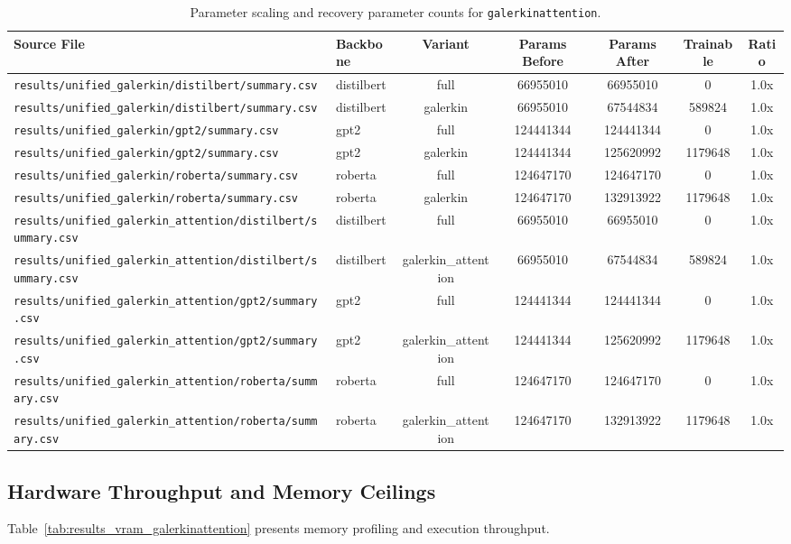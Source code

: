 \begin{table}[t]
\centering
\small
\begin{tabular}{llccccc}
\toprule
\textbf{Source File} & \textbf{Backbone} & \textbf{Variant} & \textbf{Params Before} & \textbf{Params After} & \textbf{Trainable} & \textbf{Ratio} \\
\midrule
\texttt{results/unified\_galerkin/distilbert/summary.csv} & distilbert & full & 66955010 & 66955010 & 0 & 1.0x \\
\texttt{results/unified\_galerkin/distilbert/summary.csv} & distilbert & galerkin & 66955010 & 67544834 & 589824 & 1.0x \\
\texttt{results/unified\_galerkin/gpt2/summary.csv} & gpt2 & full & 124441344 & 124441344 & 0 & 1.0x \\
\texttt{results/unified\_galerkin/gpt2/summary.csv} & gpt2 & galerkin & 124441344 & 125620992 & 1179648 & 1.0x \\
\texttt{results/unified\_galerkin/roberta/summary.csv} & roberta & full & 124647170 & 124647170 & 0 & 1.0x \\
\texttt{results/unified\_galerkin/roberta/summary.csv} & roberta & galerkin & 124647170 & 132913922 & 1179648 & 1.0x \\
\texttt{results/unified\_galerkin\_attention/distilbert/summary.csv} & distilbert & full & 66955010 & 66955010 & 0 & 1.0x \\
\texttt{results/unified\_galerkin\_attention/distilbert/summary.csv} & distilbert & galerkin\_attention & 66955010 & 67544834 & 589824 & 1.0x \\
\texttt{results/unified\_galerkin\_attention/gpt2/summary.csv} & gpt2 & full & 124441344 & 124441344 & 0 & 1.0x \\
\texttt{results/unified\_galerkin\_attention/gpt2/summary.csv} & gpt2 & galerkin\_attention & 124441344 & 125620992 & 1179648 & 1.0x \\
\texttt{results/unified\_galerkin\_attention/roberta/summary.csv} & roberta & full & 124647170 & 124647170 & 0 & 1.0x \\
\texttt{results/unified\_galerkin\_attention/roberta/summary.csv} & roberta & galerkin\_attention & 124647170 & 132913922 & 1179648 & 1.0x \\
\bottomrule
\end{tabular}
\caption{Parameter scaling and recovery parameter counts for \texttt{galerkinattention}.}
\label{tab:results_params_galerkinattention}
\end{table}

\subsection{Hardware Throughput and Memory Ceilings}
Table~\ref{tab:results_vram_galerkinattention} presents memory profiling and execution throughput.

